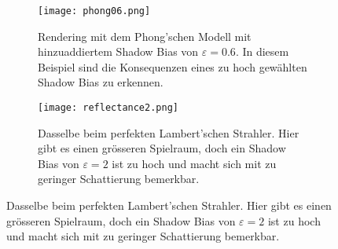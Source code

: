 \documentclass{article} %
\begin{document}
\vspace{1.5cm}

\begin{figure}[H]
     \centering
     \begin{subfigure}[b]{0.4\textwidth}
         \centering
         \texttt{[image: phong06.png]}
         \caption{Rendering mit dem Phong'schen Modell mit hinzuaddiertem Shadow Bias von $\varepsilon = 0.6$. In diesem Beispiel sind die Konsequenzen eines zu hoch gewählten Shadow Bias zu erkennen.}
     \end{subfigure}
     \hfill
     \begin{subfigure}[b]{0.4\textwidth}
         \centering
         \texttt{[image: reflectance2.png]}
         \caption{Dasselbe beim perfekten Lambert'schen Strahler. Hier gibt es einen grösseren Spielraum, doch ein Shadow Bias von $\varepsilon = 2$ ist zu hoch und macht sich mit zu geringer Schattierung bemerkbar.}
     \end{subfigure}
\end{figure}
\end{document}
